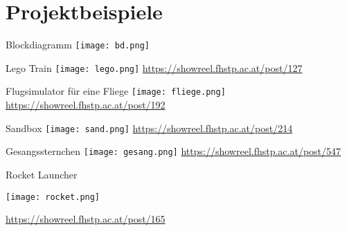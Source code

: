 \section{Projektbeispiele}
 \frame{\sectionpage}

\begin{frame}{Blockdiagramm}
\texttt{[image: bd.png]}
\end{frame}


\begin{frame}{Lego Train}
\texttt{[image: lego.png]}
\url{https://showreel.fhstp.ac.at/post/127}
\end{frame}


\begin{frame}{Flugsimulator für eine Fliege}
\texttt{[image: fliege.png]}
\url{https://showreel.fhstp.ac.at/post/192}
\end{frame}

\begin{frame}{Sandbox}
\texttt{[image: sand.png]}
\url{https://showreel.fhstp.ac.at/post/214}
\end{frame}


\begin{frame}{Gesangssternchen}
\texttt{[image: gesang.png]}
\url{https://showreel.fhstp.ac.at/post/547}
\end{frame}

\begin{frame}{Rocket Launcher}

\texttt{[image: rocket.png]}

\url{https://showreel.fhstp.ac.at/post/165}
\end{frame}




